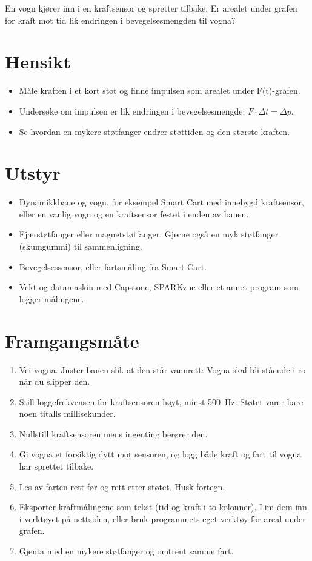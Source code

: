 \documentclass[11pt]{article}
\begin{document}

En vogn kjører inn i en kraftsensor og spretter tilbake. Er arealet under grafen for kraft mot tid lik endringen i bevegelsesmengden til vogna?

\section*{Hensikt}

\begin{itemize}
\item Måle kraften i et kort støt og finne impulsen som arealet under F(t)-grafen.
\item Undersøke om impulsen er lik endringen i bevegelsesmengde: $F \cdot Δt = Δp$.
\item Se hvordan en mykere støtfanger endrer støttiden og den største kraften.
\end{itemize}

\section*{Utstyr}

\begin{itemize}
\item Dynamikkbane og vogn, for eksempel Smart Cart med innebygd kraftsensor, eller en vanlig vogn og en kraftsensor festet i enden av banen.
\item Fjærstøtfanger eller magnetstøtfanger. Gjerne også en myk støtfanger (skumgummi) til sammenligning.
\item Bevegelsessensor, eller fartsmåling fra Smart Cart.
\item Vekt og datamaskin med Capstone, SPARKvue eller et annet program som logger målingene.
\end{itemize}

\section*{Framgangsmåte}

\begin{enumerate}
\item Vei vogna. Juster banen slik at den står vannrett: Vogna skal bli stående i ro når du slipper den.
\item Still loggefrekvensen for kraftsensoren høyt, minst 500~Hz. Støtet varer bare noen titalls millisekunder.
\item Nullstill kraftsensoren mens ingenting berører den.
\item Gi vogna et forsiktig dytt mot sensoren, og logg både kraft og fart til vogna har sprettet tilbake.
\item Les av farten rett før og rett etter støtet. Husk fortegn.
\item Eksporter kraftmålingene som tekst (tid og kraft i to kolonner). Lim dem inn i verktøyet på nettsiden, eller bruk programmets eget verktøy for areal under grafen.
\item Gjenta med en mykere støtfanger og omtrent samme fart.
\end{enumerate}
\end{document}
